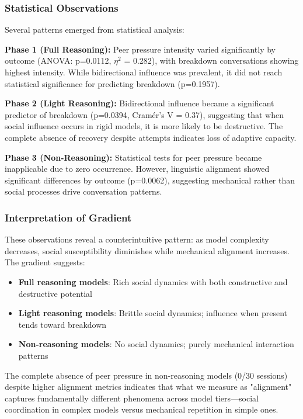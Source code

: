 \documentclass[11pt,letterpaper]{article}
\newcommand{\exponedataBidirectionalPValue}{p=0.1957}
\newcommand{\exponedataPeerPressureANOVAPValue}{p=0.0112}
\newcommand{\exptwoBidirectionalPValue}{p=0.0394}
\newcommand{\exptwoBidirectionalCramersV}{0.37}
\newcommand{\expthreeLinguisticAlignmentPValue}{p=0.0062}
\begin{document}
\subsubsection{Statistical Observations}

Several patterns emerged from statistical analysis:

\textbf{Phase 1 (Full Reasoning):} Peer pressure intensity varied significantly by outcome (ANOVA: \exponedataPeerPressureANOVAPValue{}, $\eta^2$ = 0.282), with breakdown conversations showing highest intensity. While bidirectional influence was prevalent, it did not reach statistical significance for predicting breakdown (\exponedataBidirectionalPValue{}).

\textbf{Phase 2 (Light Reasoning):} Bidirectional influence became a significant predictor of breakdown (\exptwoBidirectionalPValue{}, Cramér's V = \exptwoBidirectionalCramersV{}), suggesting that when social influence occurs in rigid models, it is more likely to be destructive. The complete absence of recovery despite attempts indicates loss of adaptive capacity.

\textbf{Phase 3 (Non-Reasoning):} Statistical tests for peer pressure became inapplicable due to zero occurrence. However, linguistic alignment showed significant differences by outcome (\expthreeLinguisticAlignmentPValue{}), suggesting mechanical rather than social processes drive conversation patterns.

\subsubsection{Interpretation of Gradient}

These observations reveal a counterintuitive pattern: as model complexity decreases, social susceptibility diminishes while mechanical alignment increases. The gradient suggests:

\begin{itemize}
    \item \textbf{Full reasoning models}: Rich social dynamics with both constructive and destructive potential
    \item \textbf{Light reasoning models}: Brittle social dynamics; influence when present tends toward breakdown
    \item \textbf{Non-reasoning models}: No social dynamics; purely mechanical interaction patterns
\end{itemize}

The complete absence of peer pressure in non-reasoning models (0/30 sessions) despite higher alignment metrics indicates that what we measure as "alignment" captures fundamentally different phenomena across model tiers—social coordination in complex models versus mechanical repetition in simple ones.
\end{document}
